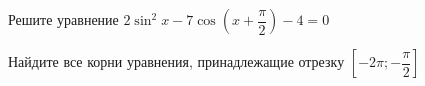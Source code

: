 \begin{ex}
	\begin{condition}
		\begin{enumcols}[label=\asbuk*)]
			\item Решите уравнение \( 2\sin^2 x -7\cos {\left(x+\dfrac{\pi}{2}\right)} - 4 = 0 \)
			\item Найдите все корни уравнения, принадлежащие отрезку \( \left[-2\pi;-\dfrac{\pi}{2}\right] \)
		\end{enumcols}
	\end{condition}
\end{ex}